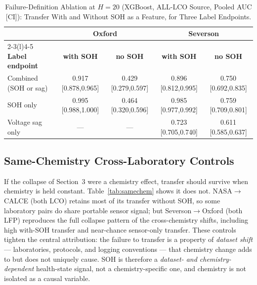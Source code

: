 \documentclass[11pt,a4paper]{article}
\begin{document}
\begin{table}[!t]
\caption{Failure-Definition Ablation at $H{=}20$ (XGBoost, ALL-LCO Source, Pooled AUC [CI]): Transfer With and Without SOH as a Feature, for Three Label Endpoints.}
\label{tab:faildef}
\centering
\footnotesize
\begin{tabular}{lcccc}
\toprule
 & \multicolumn{2}{c}{\textbf{Oxford}} & \multicolumn{2}{c}{\textbf{Severson}}\\
\cmidrule(lr){2-3}\cmidrule(l){4-5}
\textbf{Label endpoint} & \textbf{with SOH} & \textbf{no SOH} & \textbf{with SOH} & \textbf{no SOH}\\
\midrule
Combined (SOH or sag) & 0.917 [0.878,0.965] & 0.429 [0.279,0.597] & 0.896 [0.812,0.995] & 0.750 [0.692,0.835] \\
SOH only & 0.995 [0.988,1.000] & 0.464 [0.320,0.596] & 0.985 [0.977,0.992] & 0.759 [0.709,0.801] \\
Voltage sag only & --- & --- & 0.723 [0.705,0.740] & 0.611 [0.585,0.637] \\
\bottomrule
\end{tabular}
\end{table}

\subsection{Same-Chemistry Cross-Laboratory Controls}
If the collapse of Section~3 were a chemistry effect, transfer should survive when chemistry is held constant. Table~\ref{tab:samechem} shows it does not. NASA$\to$CALCE (both LCO) retains most of its transfer without SOH, so some laboratory pairs do share portable sensor signal; but Severson$\to$Oxford (both LFP) reproduces the full collapse pattern of the cross-chemistry shifts, including high with-SOH transfer and near-chance sensor-only transfer. These controls tighten the central attribution: the failure to transfer is a property of \emph{dataset shift} --- laboratories, protocols, and logging conventions --- that chemistry change adds to but does not uniquely cause. SOH is therefore a \emph{dataset- and chemistry-dependent} health-state signal, not a chemistry-specific one, and chemistry is not isolated as a causal variable.
\end{document}
